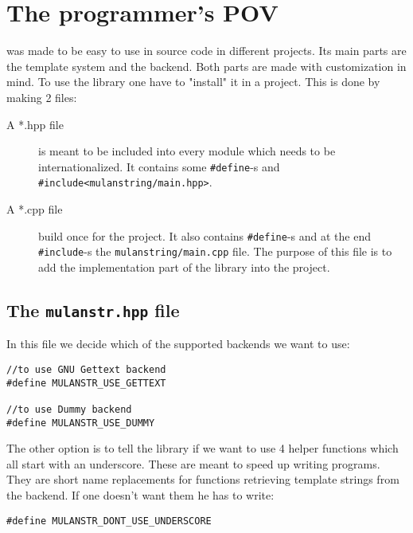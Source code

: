 \section{The programmer's POV}

\mulan{} was made to be easy to use in source code in different projects. Its main parts are the template system and the backend. 
Both parts are made with customization in mind. To use the library one have to "install" it in a project. This is done by making 2 files:
\begin{description}
	\item[A *.hpp file] is meant to be included into every module which needs to be internationalized. 
	It contains some \verb+#define+-s and \verb+#include<mulanstring/main.hpp>+.
	\item[A *.cpp file] build once for the project. It also contains \verb+#define+-s and at the end \verb+#include+-s the \verb+mulanstring/main.cpp+ file. 
	The purpose of this file is to add the implementation part of the \mulan{} library into the project.
\end{description}

\subsection{The \texttt{mulanstr.hpp} file}\label{headerFile}
In this file we decide which of the supported backends we want to use:%
\begin{verbatim}
//to use GNU Gettext backend
#define MULANSTR_USE_GETTEXT

//to use Dummy backend
#define MULANSTR_USE_DUMMY
\end{verbatim}

The other option is to tell the library if we want to use 4 helper functions which all start with an underscore.
These are meant to speed up writing programs. They are short name replacements for functions retrieving template strings from the backend.
If one doesn't want them he has to write:
\begin{verbatim}
#define MULANSTR_DONT_USE_UNDERSCORE
\end{verbatim}

